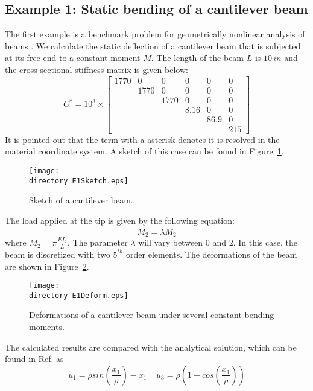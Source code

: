\subsection{Example 1: Static bending of a cantilever beam}

The first example is a benchmark problem for geometrically nonlinear
analysis of beams \cite{Simo1985,Xiao-Zhong:2012}. We calculate the static
deflection of a cantilever beam that is subjected at its free end to
a constant moment $M$.  The length of the beam $L$ is $10\,in$ and the cross-sectional stiffness 
matrix is given below:
\begin{equation}
    \label{StifE1}
    C^* = 10^3 \times \begin{bmatrix}
	1770 & 0    & 0    & 0    & 0    & 0   \\
	     & 1770 & 0    & 0    & 0    & 0   \\
	     &      & 1770 & 0    & 0    & 0   \\
	     &      &      & 8.16 & 0    & 0   \\
	     &      &      &      & 86.9 & 0   \\
	     &      &      &      &      & 215
\end{bmatrix}
\end{equation}
It is pointed out that the term with a asterisk denotes it is resolved in the material coordinate system. A sketch of this case can be found in Figure~\ref{E1Sketch}.
\begin{figure}
    \centering
    \texttt{[image: \\directory E1Sketch.eps]}
    \caption{Sketch of a cantilever beam.}
    \label{E1Sketch}
\end{figure} 
The load applied at the tip is given by the following equation:
\begin{equation}
    \label{E1Load}
    M_2 = \lambda \bar{M}_2
\end{equation}
where $\bar{M}_2 = \pi \frac{EI_2}{L}$. The parameter $\lambda$ will vary between $0$ and $2$. In 
this case, the beam is discretized with two $5^{th}$ order elements. The deformations of the beam are shown in Figure~\ref{E1Deform}.
\begin{figure}
    \centering
    \texttt{[image: \\directory E1Deform.eps]}
    \caption{Deformations of a cantilever beam under several constant bending moments.}
    \label{E1Deform}
\end{figure}
The calculated results are compared with the analytical solution, which can be found in Ref.\cite{Mayo-etal:2004} as
\begin{equation}
    \label{E1Analytical}
    u_1 = \rho sin \left( \frac{x_1}{\rho} \right) - x_1~~~~~u_3 = \rho \left(1-cos\left(\frac{x_1}{\rho}\right) \right)
\end{equation}
